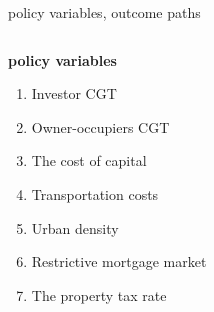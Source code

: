 \documentclass[]{beamer} %
\begin{document}
\begin{frame}{ policy variables,  outcome paths}
\Large
\begin{columns}
    \begin{column}{0.5\textwidth}
   
        \textbf{ policy variables}%
        \begin{enumerate}
        \item {Investor CGT}
        \item Owner-occupiers CGT
        \item The cost of capital%
        \item Transportation costs%
        \item Urban density%
        \item Restrictive mortgage market%
        \item The property tax rate%
    \end{enumerate}

    \end{column}

    \begin{column}{0.5\textwidth}
\end{column}
\end{columns}
\end{frame}
\end{document}
